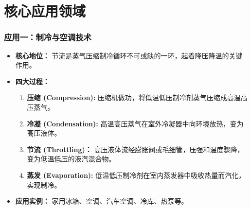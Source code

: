 \documentclass{beamer}
\begin{document}
\section{核心应用领域}

\begin{frame}
  \frametitle{应用一：制冷与空调技术}
    \begin{itemize}
        \item \textbf{核心地位：} 节流是\alert{蒸气压缩制冷循环}不可或缺的一环，起着\alert{降压降温}的关键作用。
        \vfill
        \item \textbf{四大过程：}
        \begin{enumerate}
            \item \textbf{压缩 (Compression):} 压缩机做功，将低温低压制冷剂蒸气压缩成高温高压蒸气。
            \item \textbf{冷凝 (Condensation):} 高温高压蒸气在室外冷凝器中向环境放热，变为高压液体。
            \item \textbf{\alert{节流 (Throttling)}：} 高压液体流经\alert{膨胀阀}或\alert{毛细管}，压强和温度骤降，变为低温低压的液汽混合物。
            \item \textbf{蒸发 (Evaporation):} 低温低压制冷剂在室内蒸发器中吸收热量而汽化，实现制冷。
        \end{enumerate}
        \vfill
        \item \textbf{应用实例：} 家用冰箱、空调、汽车空调、冷库、热泵等。
    \end{itemize}
\end{frame}
\end{document}

